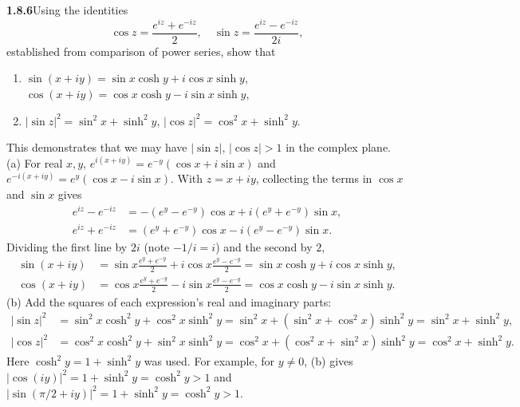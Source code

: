 \par\bigskip
\noindent\textbf{1.8.6}\quad Using the identities
\[
\cos z=\frac{e^{iz}+e^{-iz}}{2},\quad\sin z=\frac{e^{iz}-e^{-iz}}{2i},
\]
established from comparison of power series, show that
\begin{enumerate}
\item[(a)] $\sin(x+iy)=\sin x\cosh y+i\cos x\sinh y$,\\
  $\cos(x+iy)=\cos x\cosh y-i\sin x\sinh y$,
\item[(b)] $|\sin z|^{2}=\sin^{2}x+\sinh^{2}y$,\quad
  $|\cos z|^{2}=\cos^{2}x+\sinh^{2}y$.
\end{enumerate}
This demonstrates that we may have $|\sin z|$, $|\cos z|>1$ in the complex
plane.
\solution
(a) For real $x,y$, $e^{i(x+iy)}=e^{-y}(\cos x+i\sin x)$ and
$e^{-i(x+iy)}=e^y(\cos x-i\sin x)$. With $z=x+iy$, collecting the
terms in $\cos x$ and $\sin x$ gives
\[
 \begin{aligned}
 e^{iz}-e^{-iz}&=-(e^y-e^{-y})\cos x+i(e^y+e^{-y})\sin x,\\
 e^{iz}+e^{-iz}&=(e^y+e^{-y})\cos x-i(e^y-e^{-y})\sin x.
 \end{aligned}
\]
Dividing the first line by $2i$ (note $-1/i=i$) and the second by $2$,
\[
 \begin{aligned}
 \sin(x+iy)&=\sin x\frac{e^y+e^{-y}}2
       +i\cos x\frac{e^y-e^{-y}}2
       =\sin x\cosh y+i\cos x\sinh y,\\
 \cos(x+iy)&=\cos x\frac{e^y+e^{-y}}2
       -i\sin x\frac{e^y-e^{-y}}2
       =\cos x\cosh y-i\sin x\sinh y.
 \end{aligned}
\]
(b) Add the squares of each expression's real and imaginary parts:
\[
 \begin{aligned}
 |\sin z|^2&=\sin^2x\cosh^2y+\cos^2x\sinh^2y
 =\sin^2x+(\sin^2x+\cos^2x)\sinh^2y
 =\sin^2x+\sinh^2y,\\
 |\cos z|^2&=\cos^2x\cosh^2y+\sin^2x\sinh^2y
 =\cos^2x+(\cos^2x+\sin^2x)\sinh^2y
 =\cos^2x+\sinh^2y.
 \end{aligned}
\]
Here $\cosh^2y=1+\sinh^2y$ was used. For example, for $y\ne0$, (b)
gives $|\cos(iy)|^2=1+\sinh^2y=\cosh^2y>1$ and
$|\sin(\pi/2+iy)|^2=1+\sinh^2y=\cosh^2y>1$.


